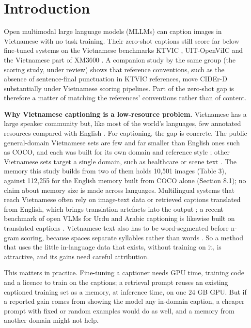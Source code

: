 \documentclass[manuscript,screen]{acmart}
\begin{document}
\section{Introduction}\label{introduction}

Open multimodal large language models (MLLMs) can caption images in Vietnamese with no task
training. Their zero-shot captions still score far below fine-tuned systems on the Vietnamese
benchmarks KTVIC \citep{Pham2024KTVIC}, UIT-OpenViIC \citep{Bui2023OpenViIC, Bui2026OpenViICJournal}
and the Vietnamese part of XM3600 \citep{Thapliyal2022XM3600}. A companion study by the same group
(the scoring study, under review) shows that reference conventions, such as the absence of
sentence-final punctuation in KTVIC references, move CIDEr-D \citep{Vedantam2015CIDEr} substantially
under Vietnamese scoring pipelines. Part of the zero-shot gap is therefore a matter of matching the
references' conventions rather than of content.

\textbf{Why Vietnamese captioning is a low-resource problem.} Vietnamese has a large speaker
community but, like most of the world's languages, few annotated resources compared with English
\citep{Joshi2020StateFate}. For captioning, the gap is concrete. The public general-domain
Vietnamese sets are few and far smaller than English ones such as COCO, and each was built for its
own domain and reference style
\citep{Lam2020UITViIC, Pham2024KTVIC, Bui2023OpenViIC, Hoang2026HDUCap}; other Vietnamese sets
target a single domain, such as healthcare \citep{Nguyen2022VieCap4H} or scene text
\citep{Nguyen2026ViTextCaps}. The memory this study builds from two of them holds 10,501 images
(Table 3), against 112,255 for the English memory built from COCO alone (Section 8.1); no claim
about memory size is made across languages. Multilingual systems that reach Vietnamese often rely on
image-text data or retrieved captions translated from English, which brings translation artefacts
into the output \citep{Vu2025VELVET, Ibrahim2025CONCAP}; a recent benchmark of open VLMs for Urdu
and Arabic captioning is likewise built on translated captions \citep{Hussain2026SciRepLVLM}.
Vietnamese text also has to be word-segmented before n-gram scoring, because spaces separate
syllables rather than words \citep{Vu2018VnCoreNLP}. So a method that uses the little in-language
data that exists, without training on it, is attractive, and its gains need careful attribution.

This matters in practice. Fine-tuning a captioner needs GPU time, training code and a licence to
train on the captions; a retrieval prompt reuses an existing captioned training set as a memory, at
inference time, on one 24 GB GPU. But if a reported gain comes from showing the model any in-domain
caption, a cheaper prompt with fixed or random examples would do as well, and a memory from another
domain might not help.
\end{document}
